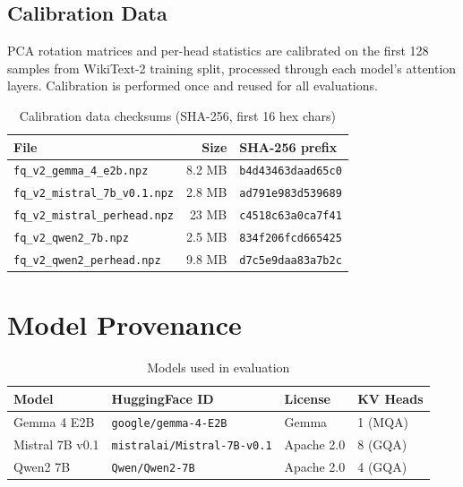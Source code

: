 \documentclass[10pt]{article}
\begin{document}
\subsection{Calibration Data}

PCA rotation matrices and per-head statistics are calibrated on the
first 128 samples from WikiText-2 training split, processed through each
model's attention layers. Calibration is performed once and reused for
all evaluations.

\begin{table}[h]
\centering
\small
\caption{Calibration data checksums (SHA-256, first 16 hex chars)}
\label{tab:checksums}
\begin{tabular}{lrl}
\toprule
File & Size & SHA-256 prefix \\
\midrule
\texttt{fq\_v2\_gemma\_4\_e2b.npz} & 8.2 MB & \texttt{b4d43463daad65c0} \\
\texttt{fq\_v2\_mistral\_7b\_v0.1.npz} & 2.8 MB & \texttt{ad791e983d539689} \\
\texttt{fq\_v2\_mistral\_perhead.npz} & 23 MB & \texttt{c4518c63a0ca7f41} \\
\texttt{fq\_v2\_qwen2\_7b.npz} & 2.5 MB & \texttt{834f206fcd665425} \\
\texttt{fq\_v2\_qwen2\_perhead.npz} & 9.8 MB & \texttt{d7c5e9daa83a7b2c} \\
\bottomrule
\end{tabular}
\end{table}

\section{Model Provenance}

\begin{table}[h]
\centering
\small
\caption{Models used in evaluation}
\begin{tabular}{llll}
\toprule
Model & HuggingFace ID & License & KV Heads \\
\midrule
Gemma 4 E2B & \texttt{google/gemma-4-E2B} & Gemma & 1 (MQA) \\
Mistral 7B v0.1 & \texttt{mistralai/Mistral-7B-v0.1} & Apache 2.0 & 8 (GQA) \\
Qwen2 7B & \texttt{Qwen/Qwen2-7B} & Apache 2.0 & 4 (GQA) \\
\bottomrule
\end{tabular}
\end{table}
\end{document}
